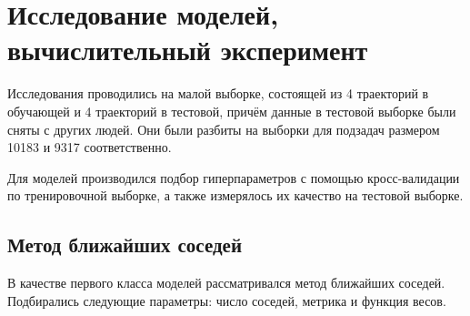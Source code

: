 \documentclass[12pt,twoside]{article}
\begin{document}
\section{Исследование моделей, вычислительный эксперимент}

Исследования проводились на малой выборке, состоящей из 4 траекторий в обучающей и 4 траекторий в тестовой, причём данные в тестовой выборке были сняты с других людей. Они были разбиты 
на выборки для подзадач размером 10183 и 9317 соответственно.

Для моделей производился подбор гиперпараметров с помощью кросс-валидации по тренировочной выборке, а также измерялось их качество на тестовой выборке.

\subsection{Метод ближайших соседей}
В качестве первого класса моделей рассматривался метод ближайших соседей. Подбирались следующие параметры: число соседей, метрика и функция весов.
\end{document}
